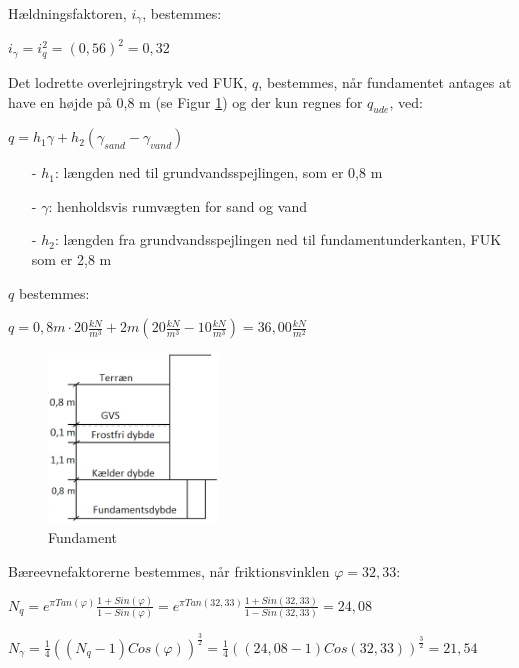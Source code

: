 Hældningsfaktoren, $i_{\gamma}$, bestemmes:
\begin{center}
	$i_{\gamma} = i_q^2 = (0,\!56)^2 = 0,\!32$
\end{center}

Det lodrette overlejringstryk ved FUK, $q$, bestemmes, når fundamentet antages at have en højde på 0,8 m (se Figur \ref{fig:hihi}) og der kun regnes for $q_{ude}$, ved:
\begin{center}
	$q = h_1 \gamma + h_2 (\gamma_{sand} - \gamma_{vand})$
\end{center}

\begin{itemize}
	\item[-] $h_1$: længden ned til grundvandsspejlingen, som er 0,8 m
	\item[-] $\gamma$: henholdsvis rumvægten for sand og vand
	\item[-] $h_2$: længden fra grundvandsspejlingen ned til fundamentunderkanten, FUK som er 2,8 m
\end{itemize}

$q$ bestemmes:
\begin{center}
	$q = 0,\!8 m \cdot 20\frac{kN}{m^3} + 2 m (20\frac{kN}{m^3} - 10\frac{kN}{m^3}) = 36,\!00 \frac{kN}{m^2}$
\end{center}

\begin{figure}[htbp]
	\centering
	\includegraphics[width=0.4\textwidth]{billeder/fundamentsdybde.png}
	\caption{Fundament}
	\label{fig:hihi}
\end{figure}

Bæreevnefaktorerne bestemmes, når friktionsvinklen $\varphi = 32,\!33$:
\begin{center}
	$N_q = e^{\pi Tan(\varphi)} \frac{1 + Sin(\varphi)}{1 - Sin(\varphi)} = e^{\pi Tan(32,\!33)} \frac{1 + Sin(32,\!33)}{1 - Sin(32,\!33)} = 24,\!08$
\end{center}

\begin{center}
	$N_\gamma = \frac{1}{4}((N_q - 1)Cos(\varphi))^\frac{3}{2} = \frac{1}{4}((24,\!08 - 1)Cos(32,\!33))^\frac{3}{2}=21,\!54$
\end{center}

